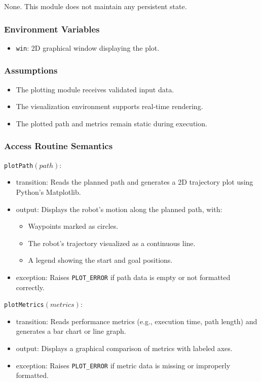 \documentclass[12pt, titlepage]{article}
\begin{document}
None. This module does not maintain any persistent state.

\subsubsection{Environment Variables}

\begin{itemize}
    \item \texttt{win}: 2D graphical window displaying the plot.
\end{itemize}

\subsubsection{Assumptions}

\begin{itemize}
    \item The plotting module receives validated input data.
    \item The visualization environment supports real-time rendering.
    \item The plotted path and metrics remain static during execution.
\end{itemize}

\subsubsection{Access Routine Semantics}

\noindent \texttt{plotPath}$(path)$:
\begin{itemize}
    \item transition: Reads the planned path and generates a 2D trajectory plot using Python's Matplotlib.
    \item output: Displays the robot's motion along the planned path, with:
    \begin{itemize}
        \item Waypoints marked as circles.
        \item The robot's trajectory visualized as a continuous line.
        \item A legend showing the start and goal positions.
    \end{itemize}
    \item exception: Raises \texttt{PLOT\_ERROR} if path data is empty or not formatted correctly.
\end{itemize}

\noindent \texttt{plotMetrics}$(metrics)$:
\begin{itemize}
    \item transition: Reads performance metrics (e.g., execution time, path length) and generates a bar chart or line graph.
    \item output: Displays a graphical comparison of metrics with labeled axes.
    \item exception: Raises \texttt{PLOT\_ERROR} if metric data is missing or improperly formatted.
\end{itemize}
\end{document}
